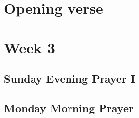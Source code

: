 

\chapter{Opening verse}

{%
\parindent 0pt
\noindent
\ifx\preLilyPondExample \undefined
\else
  \expandafter\preLilyPondExample
\fi
\def\lilypondbook{}%

\ifx\postLilyPondExample \undefined
\else
  \expandafter\postLilyPondExample
\fi
}

\chapter{Week 3}

\section{Sunday Evening Prayer I}

{%
\parindent 0pt
\noindent
\ifx\preLilyPondExample \undefined
\else
  \expandafter\preLilyPondExample
\fi
\def\lilypondbook{}%

\ifx\postLilyPondExample \undefined
\else
  \expandafter\postLilyPondExample
\fi
}

\newpage

\section{Monday Morning Prayer}

{%
\parindent 0pt
\noindent
\ifx\preLilyPondExample \undefined
\else
  \expandafter\preLilyPondExample
\fi
\def\lilypondbook{}%

\ifx\postLilyPondExample \undefined
\else
  \expandafter\postLilyPondExample
\fi
}



\null\medskip{%
\parindent 0pt
\noindent
\ifx\preLilyPondExample \undefined
\else
  \expandafter\preLilyPondExample
\fi
\def\lilypondbook{}%

\ifx\postLilyPondExample \undefined
\else
  \expandafter\postLilyPondExample
\fi
}

\newpage

